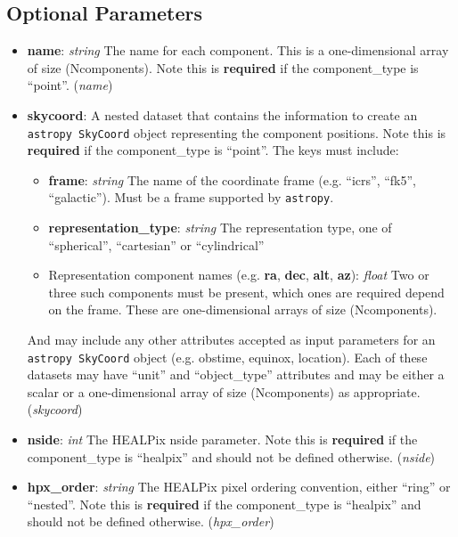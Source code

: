 \documentclass[11pt, oneside]{article}
\begin{document}
\subsection{Optional Parameters}
\label{sec:opt_params}
\begin{itemize}
\item \textbf{name}: \textit{string} The name for each component. This is a one-dimensional array of size (Ncomponents).
Note this is \textbf{required} if the component\_type is ``point''. (\textit{name})

\item \textbf{skycoord}:
A nested dataset that contains the information to create an \texttt{astropy SkyCoord} object representing the component positions.
Note this is \textbf{required} if the component\_type is ``point''. The keys must include:
	\begin{itemize}
	\item \textbf{frame}: \textit{string} The name of the coordinate frame (e.g. ``icrs'', ``fk5'', ``galactic''). Must be a frame supported by \texttt{astropy}.
	\item \textbf{representation\_type}: \textit{string} The representation type, one of ``spherical'', ``cartesian'' or ``cylindrical''
	\item Representation component names (e.g. \textbf{ra}, \textbf{dec}, \textbf{alt}, \textbf{az}): \textit{float} Two or three such components must be present, 	which ones are required depend on the frame. These are one-dimensional arrays of size (Ncomponents).
	\end{itemize}
And may include any other attributes accepted as input parameters for an \texttt{astropy SkyCoord} object (e.g. obstime, equinox, location).
Each of these datasets may have ``unit'' and ``object\_type'' attributes and may be either a scalar or a one-dimensional array of size (Ncomponents) as appropriate.
(\textit{skycoord})

\item \textbf{nside}: \textit{int}
The HEALPix nside parameter. Note this is \textbf{required} if the component\_type is ``healpix'' and should not be defined otherwise. (\textit{nside})

\item \textbf{hpx\_order}: \textit{string}
The HEALPix pixel ordering convention, either ``ring'' or ``nested''.
Note this is \textbf{required} if the component\_type is ``healpix'' and should not be defined otherwise. (\textit{hpx\_order})


\end{itemize}
\end{document}

